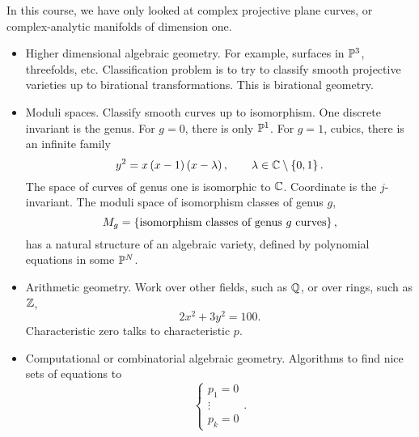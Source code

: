 In this course, we have only looked at complex projective plane curves, or complex-analytic manifolds of dimension one.
\begin{itemize}
\item Higher dimensional algebraic geometry. For example, surfaces in $ \P^3 $, threefolds, etc. Classification problem is to try to classify smooth projective varieties up to birational transformations. This is birational geometry.
\item Moduli spaces. Classify smooth curves up to isomorphism. One discrete invariant is the genus. For $ g = 0 $, there is only $ \P^1 $. For $ g = 1 $, cubics, there is an infinite family
$$ y^2 = x\rb{x - 1}\rb{x - \lambda}, \qquad \lambda \in \C \setminus \cb{0, 1}. $$
The space of curves of genus one is isomorphic to $ \C $. Coordinate is the $ j $-invariant. The moduli space of isomorphism classes of genus $ g $,
$$ M_g = \cb{\text{isomorphism classes of genus} \ g \ \text{curves}}, $$
has a natural structure of an algebraic variety, defined by polynomial equations in some $ \P^N $.
\item Arithmetic geometry. Work over other fields, such as $ \Q $, or over rings, such as $ \Z $,
$$ 2x^2 + 3y^2 = 100. $$
Characteristic zero talks to characteristic $ p $.
\item Computational or combinatorial algebraic geometry. Algorithms to find nice sets of equations to
$$
\begin{cases}
p_1 = 0 \\
\vdots \\
p_k = 0
\end{cases}.
$$
\end{itemize}

